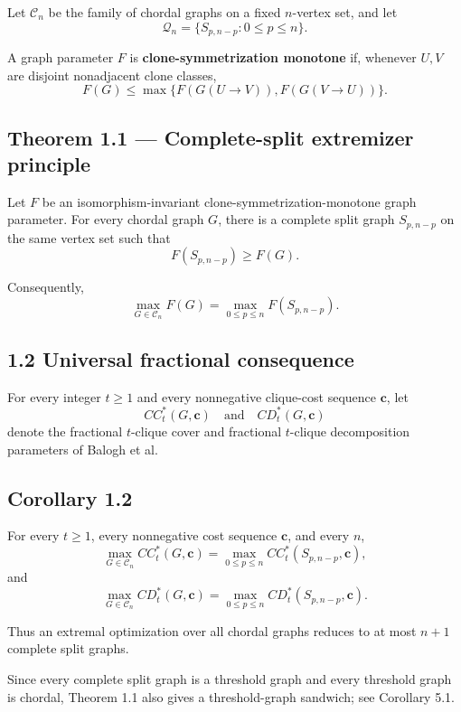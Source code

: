 \documentclass[11pt,a4paper]{article}
\begin{document}
Let \(\mathcal C_n\) be the family of chordal graphs on a fixed
\(n\)-vertex set, and let
\[
\mathcal Q_n
=
\{S_{p,n-p}:0\le p\le n\}.
\]

A graph parameter \(F\) is \textbf{clone-symmetrization monotone} if, whenever
\(U,V\) are disjoint nonadjacent clone classes,
\[
F(G)
\le
\max\{F(G(U\to V)),F(G(V\to U))\}.
\tag{1.2}
\]

\subsection{Theorem 1.1 --- Complete-split extremizer principle}\label{theorem-1.1-complete-split-extremizer-principle}

Let \(F\) be an isomorphism-invariant clone-symmetrization-monotone graph
parameter. For every chordal graph \(G\), there is a complete split graph
\(S_{p,n-p}\) on the same vertex set such that
\[
F(S_{p,n-p})\ge F(G).
\tag{1.3}
\]

Consequently,
\[
\boxed{
\max_{G\in\mathcal C_n}F(G)
=
\max_{0\le p\le n}F(S_{p,n-p}).
}
\tag{1.4}
\]

\subsection{1.2 Universal fractional consequence}\label{universal-fractional-consequence}

For every integer \(t\ge1\) and every nonnegative clique-cost sequence
\(\mathbf c\), let
\[
CC_t^*(G,\mathbf c)
\quad\text{and}\quad
CD_t^*(G,\mathbf c)
\]
denote the fractional \(t\)-clique cover and fractional \(t\)-clique
decomposition parameters of Balogh et al.

\subsection{Corollary 1.2}\label{corollary-1.2}

For every \(t\ge1\), every nonnegative cost sequence \(\mathbf c\), and every
\(n\),
\[
\max_{G\in\mathcal C_n}CC_t^*(G,\mathbf c)
=
\max_{0\le p\le n}CC_t^*(S_{p,n-p},\mathbf c),
\tag{1.5}
\]
and
\[
\max_{G\in\mathcal C_n}CD_t^*(G,\mathbf c)
=
\max_{0\le p\le n}CD_t^*(S_{p,n-p},\mathbf c).
\tag{1.6}
\]

Thus an extremal optimization over all chordal graphs reduces to at most
\(n+1\) complete split graphs.

Since every complete split graph is a threshold graph and every threshold
graph is chordal, Theorem 1.1 also gives a threshold-graph sandwich; see
Corollary 5.1.
\end{document}
